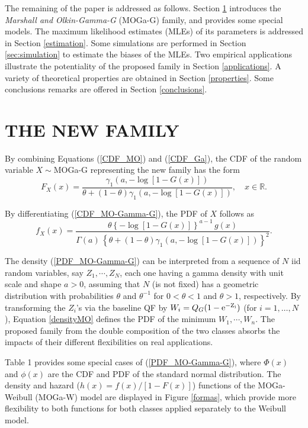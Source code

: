 \documentclass[twoside,leqno,11pt]{article}
\begin{document}
The remaining of the paper is addressed as follows. Section \ref{sec:MOGaG} introduces the {\it Marshall and Olkin-Gamma-G} (MOGa-G) family, and provides some special models. The maximum likelihood estimates (MLEs) of its parameters is addressed in Section \ref{estimation}. Some simulations are performed in Section \ref{sec:simulation} to estimate the biases of the MLEs. Two empirical applications illustrate the potentiality of the proposed family in Section \ref{applications}. A variety of theoretical properties are obtained in Section \ref{properties}. Some conclusions remarks are offered in Section \ref{conclusions}.

\section{THE NEW FAMILY}\label{sec:MOGaG}

By combining Equations (\ref{CDF_MO}) and (\ref{CDF_Ga}), the CDF of the random variable $X\sim$MOGa-G representing the new family 
has the form 
\begin{equation}\label{CDF_MO-Gamma-G}
F_{X}(x)=\frac{\gamma_1\left( a, -\log \left[1-G(x)\right]\right)}{\theta+(1-\theta)\gamma_1\left( a, -\log \left[1-G(x)\right]\right)},\quad x \in \mathbb{R}.
\end{equation}

By differentiating (\ref{CDF_MO-Gamma-G}), the PDF of $X$ follows as
\begin{equation}\label{PDF_MO-Gamma-G}
f_{X}(x)=\frac{\theta  \left\{ -\log[1-G(x)] \right\}^{a-1}\, g(x)}{\Gamma(a)\,\left\{\theta+(1-\theta)\gamma_1\left( a, -\log \left[1-G(x)\right]\right)\right\}^{2}}.
\end{equation}

The density (\ref{PDF_MO-Gamma-G}) can be interpreted from a sequence of $N$ iid random variables, say $Z_1,\cdots,Z_N$,
each one having a gamma density with unit scale and shape $a>0$, assuming that $N$ (is not fixed) has a geometric 
distribution with probabilities $\theta$ and $\theta^{-1}$ for $0<\theta<1$ and $\theta>1$,
respectively. By transforming the $Z_i$'s via the baseline QF by $W_i=Q_G(1-\rm{e}^{-Z_i})$ (for $i=1,\ldots,N$), Equation \eqref{densityMO} defines the PDF of the minimum $W_1,\cdots,W_n$. 
The proposed family from the double composition of the two 
classes absorbs the impacts of their different flexibilities on real applications. 


Table 1 provides some special cases of (\ref{PDF_MO-Gamma-G}), where $\Phi(x)$ and $\phi(x)$ are the CDF and PDF of the standard normal distribution. The density and hazard ($h(x) = f(x)/[1-F(x)]$) functions of the MOGa-Weibull (MOGa-W) model 
are displayed in Figure \ref{formas}, which provide more flexibility to both functions for both classes applied separately to the Weibull model. 
\end{document}
